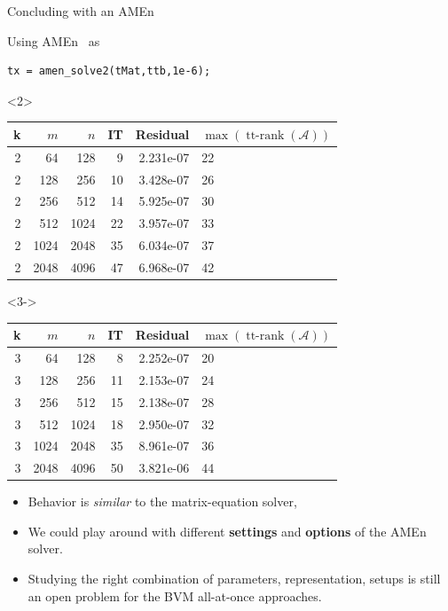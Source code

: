\documentclass[aspectratio=169,xcolor=dvipsnames]{beamer}
\begin{document}
\begin{frame}[fragile]{\faCross\;Concluding with an AMEn}

Using AMEn~\parencite{MR3262607} as \vspace{-0.5em}
\begin{verbatim}
tx = amen_solve2(tMat,ttb,1e-6);
\end{verbatim}

\begin{onlyenv}<2>
\begin{center}
\begin{tabular}{rrrrrl}
\toprule
k & $m$ & $n$ & IT & Residual & $\max(\operatorname{tt-rank}(\mathcal{A}))$ \\
\midrule
2 & 64 & 128 & 9 & 2.231e-07 & 22 \\
2 & 128 & 256 & 10 & 3.428e-07 & 26\\
2 & 256 & 512 & 14 & 5.925e-07 & 30 \\
2 & 512 & 1024 & 22 & 3.957e-07 & 33 \\
2 & 1024 & 2048 & 35 & 6.034e-07 & 37 \\
2 & 2048 & 4096 & 47 & 6.968e-07 & 42 \\ 
\bottomrule
\end{tabular}
\end{center}
\end{onlyenv}
\begin{onlyenv}<3->
	\begin{center}
		\begin{tabular}{rrrrrl}
			\toprule
		k & $m$ & $n$ & IT & Residual & $\max(\operatorname{tt-rank}(\mathcal{A}))$ \\
		\midrule
3 & 64 & 128 & 8 & 2.252e-07 & 20 \\
3 & 128 & 256 &  11 & 2.153e-07 & 24 \\
3 & 256 & 512 & 15 & 2.138e-07 & 28 \\
3 & 512 & 1024 & 18 & 2.950e-07 & 32 \\
3 & 1024 & 2048 & 35 & 8.961e-07 & 36 \\
3 & 2048 & 4096 & 50 & 3.821e-06 & 44 \\
\bottomrule
\end{tabular}
\end{center}
\end{onlyenv}

\begin{itemize}
	\item[\faEye]<4-> Behavior is \emph{similar} to the matrix-equation solver,
	\item[\faHammer]<5-> We could play around with different \textbf{settings} and \textbf{options} of the AMEn solver.
	\item[\faBinoculars]<6-> Studying the right combination of parameters, representation, setups is still an open problem for the BVM all-at-once approaches.
\end{itemize}

\end{frame}
\end{document}
